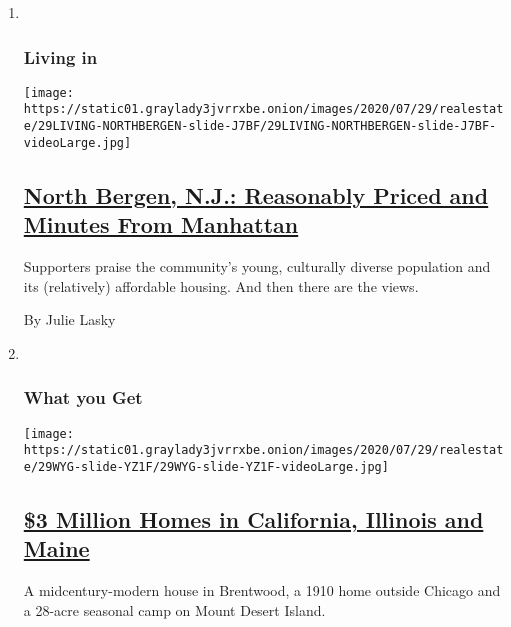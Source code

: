 \begin{enumerate}
\def\labelenumi{\arabic{enumi}.}
\item ~
  \hypertarget{living-in}{%
  \subsubsection{Living in}\label{living-in}}

  \texttt{[image: https://static01.graylady3jvrrxbe.onion/images/2020/07/29/realestate/29LIVING-NORTHBERGEN-slide-J7BF/29LIVING-NORTHBERGEN-slide-J7BF-videoLarge.jpg]}

  \hypertarget{north-bergen-nj-reasonably-priced-and-minutes-from-manhattan}{%
  \subsection{\texorpdfstring{\href{/2020/07/29/realestate/north-bergen-nj-reasonably-priced-and-minutes-from-manhattan.html}{North
  Bergen, N.J.: Reasonably Priced and Minutes From
  Manhattan}}{North Bergen, N.J.: Reasonably Priced and Minutes From Manhattan}}\label{north-bergen-nj-reasonably-priced-and-minutes-from-manhattan}}

  Supporters praise the community's young, culturally diverse population
  and its (relatively) affordable housing. And then there are the views.

  By Julie Lasky
\item ~
  \hypertarget{what-you-get}{%
  \subsubsection{What you Get}\label{what-you-get}}

  \texttt{[image: https://static01.graylady3jvrrxbe.onion/images/2020/07/29/realestate/29WYG-slide-YZ1F/29WYG-slide-YZ1F-videoLarge.jpg]}

  \hypertarget{3-million-homes-in-california-illinois-and-maine}{%
  \subsection{\texorpdfstring{\href{/2020/07/29/realestate/3-million-homes-in-california-illinois-and-maine.html}{\$3
  Million Homes in California, Illinois and
  Maine}}{\$3 Million Homes in California, Illinois and Maine}}\label{3-million-homes-in-california-illinois-and-maine}}

  A midcentury-modern house in Brentwood, a 1910 home outside Chicago
  and a 28-acre seasonal camp on Mount Desert Island.


\end{enumerate}
